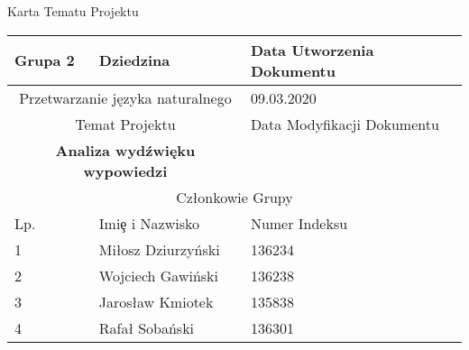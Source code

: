 \documentclass[11pt,a4paper]{article}
\begin{document}
\begin{center}
    \Large
    Karta Tematu Projektu
\end{center}
\begin{table}[h]
    \centering
    \begin{tabular}{|p{3cm}|p{5cm}|p{5cm}|}
         \hline
         Grupa 2 & Dziedzina & Data Utworzenia Dokumentu \\ \hline
        \multicolumn{2}{|c|}{Przetwarzanie języka naturalnego} & 09.03.2020 \\ \hline
         \multicolumn{2}{|c|}{Temat Projektu} & Data Modyfikacji Dokumentu \\ \hline
         \multicolumn{2}{|c|}{\textbf{Analiza wydźwięku wypowiedzi}} & \date{\today} \\ \hline
         \multicolumn{3}{|c|}{Członkowie Grupy} \\ \hline
         Lp. & Imi\c e i Nazwisko & Numer Indeksu \\ \hline     
         1 & Miłosz Dziurzyński & 136234 \\ \hline
         2 & Wojciech Gawiński & 136238 \\ \hline
         3 & Jarosław Kmiotek & 135838 \\ \hline
         4 & Rafał Sobański & 136301 \\ \hline
    \end{tabular}
    \label{tab:my_label}
\end{table}
\end{document}
